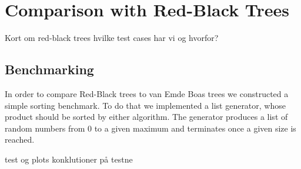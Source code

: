\section*{Comparison with Red-Black Trees}
Kort om red-black trees
hvilke test cases har vi og hvorfor?

\subsection*{Benchmarking}

In order to compare Red-Black trees to van Emde Boas trees we constructed a simple sorting benchmark.
To do that we implemented a list generator, whose product should be sorted by either algorithm.
The generator produces a list of random numbers from 0 to a given maximum and terminates once a given size is reached.

test og plots
konklutioner på testne